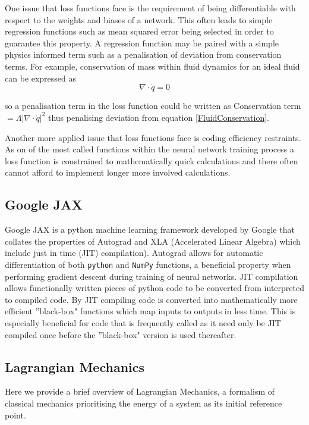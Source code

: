 \documentclass[10pt]{iopart}
\begin{document}
One issue that loss functions face is the requirement of being differentiable with respect to the weights and biases of a network. This often leads to simple regression functions such as mean squared error being selected in order to guarantee this property. A regression function may be paired with a simple physics informed term such as a penalisation of deviation from conservation terms. For example, conservation of mass within fluid dynamics for an ideal fluid can be expressed as 
\begin{equation}
\label{FluidConservation}
	\nabla \cdot\dot q = 0
\end{equation}
 
so a penalisation term in the loss function could be written as Conservation term $=\Lambda|\nabla \cdot \dot q|^2$ thus penalising deviation from equation \ref{FluidConservation}.

Another more applied issue that loss functions face is coding efficiency restraints. As on of the most called functions within the neural network training process a loss function is constrained to mathematically quick calculations and there often cannot afford to implement longer more involved calculations. 

\subsection{Google JAX}
Google JAX \cite{Jax} is a python machine learning framework developed by Google that collates the properties of Autograd \cite{Autograd} and XLA (Accelerated Linear Algebra) \cite{XLA} which include just in time (JIT) compilation). Autograd allows for automatic differentiation of both \texttt{python} and \texttt{NumPy} functions, a beneficial property when performing gradient descent during training of neural networks. JIT compilation allows functionally written pieces of python code to be converted from interpreted to compiled code. By JIT compiling code is converted into mathematically more efficient ''black-box" functions which map inputs to outputs in less time. This is especially beneficial for code that is frequently called as it need only be JIT compiled once before the ''black-box" version is  used thereafter.


\subsection{Lagrangian Mechanics}
Here we provide a brief overview of Lagrangian Mechanics, a formalism of classical mechanics prioritising the energy of a system as its initial reference point. 
\end{document}
